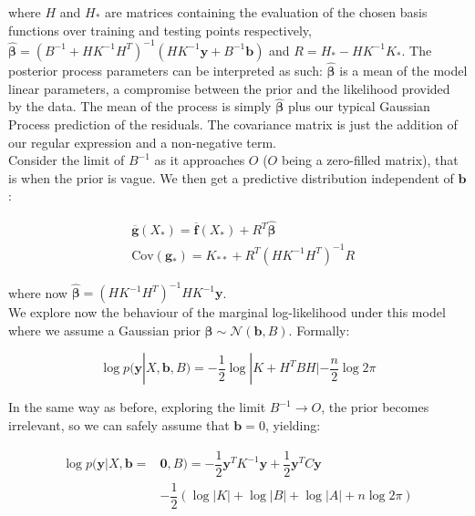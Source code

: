 \documentclass[10pt,a4paper,twoside]{book}
\begin{document}
where $H$ and $H_*$ are matrices containing the evaluation of the chosen basis functions over training and testing points respectively, $\hat{\boldsymbol{\beta}} = (B^{-1} + H K^{-1} H^T)^{-1}(H K^{-1}\boldsymbol{y} + B^{-1}\boldsymbol{b})$ and $R = H_* - HK^{-1}K_{*}$. The posterior process parameters can be interpreted as such: $\hat{\boldsymbol{\beta}}$ is a mean of the model linear parameters, a compromise between the prior and the likelihood provided by the data. The mean of the process is simply $\hat{\boldsymbol{\beta}}$ plus our typical Gaussian Process prediction of the residuals. The covariance matrix is just the addition of our regular expression and a non-negative term.\\

Consider the limit of $B^{-1}$ as it approaches $O$ ($O$ being a zero-filled matrix), that is when the prior is vague. We then get a predictive distribution independent of $\boldsymbol{b}$:

\begin{align}
&\overline{\boldsymbol{g}}(X_*) = \overline{\boldsymbol{f}}(X_*) + R^T\hat{\boldsymbol{\beta}}\\
&\mathrm{Cov}(\boldsymbol{g_*}) = K_{**} + R^T\left(HK^{-1}H^T\right)^{-1}R
\end{align}

where now $\hat{\boldsymbol{\beta}} = \left(HK^{-1}H^T\right)^{-1}HK^{-1}\boldsymbol{y}$.\\

We explore now the behaviour of the marginal log-likelihood under this model where we assume a Gaussian prior $\boldsymbol{\beta} \sim \mathcal{N}(\boldsymbol{b}, B)$. Formally:

\begin{equation}
\log p(\boldsymbol{y}|X, \boldsymbol{b}, B) = -\dfrac{1}{2}\log |K + H^T B H| - \dfrac{n}{2}\log 2\pi
\end{equation}

In the same way as before, exploring the limit $B^{-1} \rightarrow O$, the prior becomes irrelevant, so we can safely assume that $\boldsymbol{b} = 0$, yielding:

\begin{align}
\log p(\boldsymbol{y}|X, \boldsymbol{b} =& \boldsymbol{0}, B) = -\dfrac{1}{2}\boldsymbol{y}^T K^{-1}\boldsymbol{y} + \dfrac{1}{2}\boldsymbol{y}^T C \boldsymbol{y}\\
&- \dfrac{1}{2}\left(\log |K| + \log |B| + \log |A| + n\log 2\pi \right)
\end{align}
\end{document}
